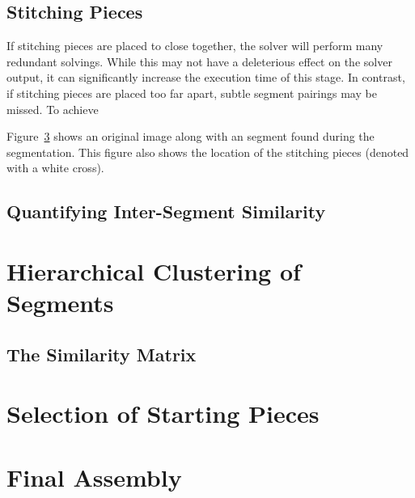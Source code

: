 \subsection{Stitching Pieces}

If stitching pieces are placed to close together, the solver will perform many redundant solvings.  While this may not have a deleterious effect on the solver output, it can significantly increase the execution time of this stage.  In contrast, if stitching pieces are placed too far apart, subtle segment pairings may be missed.  To achieve 

Figure~\ref{} shows an original image along with an segment found during the segmentation.  This figure also shows the location of the stitching pieces (denoted with a white cross).  

\subsection{Quantifying Inter-Segment Similarity}



\section{Hierarchical Clustering of Segments}

\subsection{The Similarity Matrix}

\section{Selection of Starting Pieces}

\section{Final Assembly}